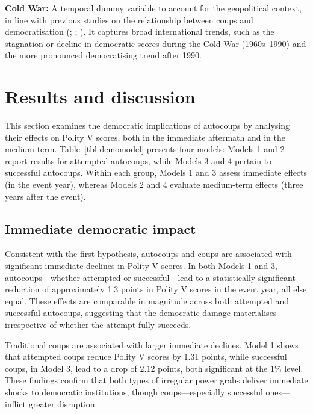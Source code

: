\documentclass[
  12pt,
]{report}
\begin{document}
\textbf{Cold War:} A temporal dummy variable to account for the
geopolitical context, in line with previous studies on the relationship
between coups and democratisation (; ; ). It captures
broad international trends, such as the stagnation or decline in
democratic scores during the Cold War (1960s--1990) and the more
pronounced democratising trend after 1990.

\section{Results and discussion}\label{results-and-discussion-2}

This section examines the democratic implications of autocoups by
analysing their effects on Polity V scores, both in the immediate
aftermath and in the medium term. Table~\ref{tbl-demomodel} presents
four models: Models 1 and 2 report results for attempted autocoups,
while Models 3 and 4 pertain to successful autocoups. Within each group,
Models 1 and 3 assess immediate effects (in the event year), whereas
Models 2 and 4 evaluate medium-term effects (three years after the
event).

\subsection*{Immediate democratic
impact}\label{immediate-democratic-impact}

Consistent with the first hypothesis, autocoups and coups are associated
with significant immediate declines in Polity V scores. In both Models 1
and 3, autocoups---whether attempted or successful---lead to a
statistically significant reduction of approximately 1.3 points in
Polity V scores in the event year, all else equal. These effects are
comparable in magnitude across both attempted and successful autocoups,
suggesting that the democratic damage materialises irrespective of
whether the attempt fully succeeds.

Traditional coups are associated with larger immediate declines. Model 1
shows that attempted coups reduce Polity V scores by 1.31 points, while
successful coups, in Model 3, lead to a drop of 2.12 points, both
significant at the \(1\%\) level. These findings confirm that both types
of irregular power grabs deliver immediate shocks to democratic
institutions, though coups---especially successful ones---inflict
greater disruption.
\end{document}
